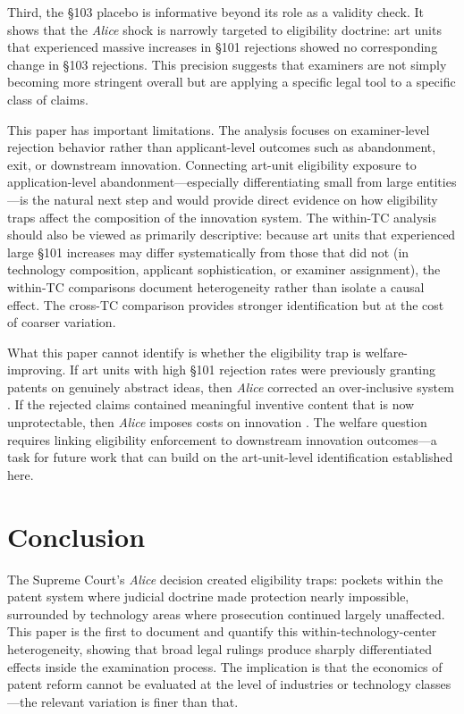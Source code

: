 \documentclass[12pt]{article}
\begin{document}
Third, the \S103 placebo is informative beyond its role as a validity check. It shows that the \textit{Alice} shock is narrowly targeted to eligibility doctrine: art units that experienced massive increases in \S101 rejections showed no corresponding change in \S103 rejections. This precision suggests that examiners are not simply becoming more stringent overall but are applying a specific legal tool to a specific class of claims.

This paper has important limitations. The analysis focuses on examiner-level rejection behavior rather than applicant-level outcomes such as abandonment, exit, or downstream innovation. Connecting art-unit eligibility exposure to application-level abandonment---especially differentiating small from large entities---is the natural next step and would provide direct evidence on how eligibility traps affect the composition of the innovation system. The within-TC analysis should also be viewed as primarily descriptive: because art units that experienced large \S101 increases may differ systematically from those that did not (in technology composition, applicant sophistication, or examiner assignment), the within-TC comparisons document heterogeneity rather than isolate a causal effect. The cross-TC comparison provides stronger identification but at the cost of coarser variation.

What this paper cannot identify is whether the eligibility trap is welfare-improving. If art units with high \S101 rejection rates were previously granting patents on genuinely abstract ideas, then \textit{Alice} corrected an over-inclusive system \citep{jaffe2004}. If the rejected claims contained meaningful inventive content that is now unprotectable, then \textit{Alice} imposes costs on innovation \citep{williams2013, budish2015, galasso2015}. The welfare question requires linking eligibility enforcement to downstream innovation outcomes---a task for future work that can build on the art-unit-level identification established here.


\section{Conclusion}

The Supreme Court's \textit{Alice} decision created eligibility traps: pockets within the patent system where judicial doctrine made protection nearly impossible, surrounded by technology areas where prosecution continued largely unaffected. This paper is the first to document and quantify this within-technology-center heterogeneity, showing that broad legal rulings produce sharply differentiated effects inside the examination process. The implication is that the economics of patent reform cannot be evaluated at the level of industries or technology classes---the relevant variation is finer than that.
\end{document}
